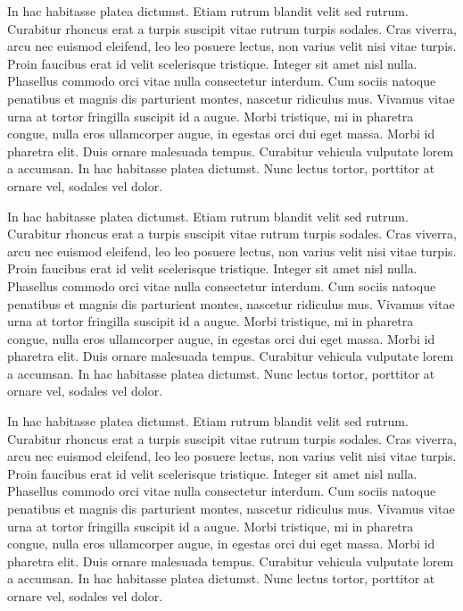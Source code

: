 In hac habitasse platea dictumst. Etiam rutrum blandit velit sed
rutrum. Curabitur rhoncus erat a turpis suscipit vitae rutrum turpis
sodales. Cras viverra, arcu nec euismod eleifend, leo leo posuere
lectus, non varius velit nisi vitae turpis. Proin faucibus erat id
velit scelerisque tristique. Integer sit amet nisl nulla. Phasellus
commodo orci vitae nulla consectetur interdum. Cum sociis natoque
penatibus et magnis dis parturient montes, nascetur ridiculus
mus. Vivamus vitae urna at tortor fringilla suscipit id a augue. Morbi
tristique, mi in pharetra congue, nulla eros ullamcorper augue, in
egestas orci dui eget massa. Morbi id pharetra elit. Duis ornare
malesuada tempus. Curabitur vehicula vulputate lorem a accumsan. In
hac habitasse platea dictumst. Nunc lectus tortor, porttitor at ornare
vel, sodales vel dolor.

In hac habitasse platea dictumst. Etiam rutrum blandit velit sed
rutrum. Curabitur rhoncus erat a turpis suscipit vitae rutrum turpis
sodales. Cras viverra, arcu nec euismod eleifend, leo leo posuere
lectus, non varius velit nisi vitae turpis. Proin faucibus erat id
velit scelerisque tristique. Integer sit amet nisl nulla. Phasellus
commodo orci vitae nulla consectetur interdum. Cum sociis natoque
penatibus et magnis dis parturient montes, nascetur ridiculus
mus. Vivamus vitae urna at tortor fringilla suscipit id a augue. Morbi
tristique, mi in pharetra congue, nulla eros ullamcorper augue, in
egestas orci dui eget massa. Morbi id pharetra elit. Duis ornare
malesuada tempus. Curabitur vehicula vulputate lorem a accumsan. In
hac habitasse platea dictumst. Nunc lectus tortor, porttitor at ornare
vel, sodales vel dolor.

In hac habitasse platea dictumst. Etiam rutrum blandit velit sed
rutrum. Curabitur rhoncus erat a turpis suscipit vitae rutrum turpis
sodales. Cras viverra, arcu nec euismod eleifend, leo leo posuere
lectus, non varius velit nisi vitae turpis. Proin faucibus erat id
velit scelerisque tristique. Integer sit amet nisl nulla. Phasellus
commodo orci vitae nulla consectetur interdum. Cum sociis natoque
penatibus et magnis dis parturient montes, nascetur ridiculus
mus. Vivamus vitae urna at tortor fringilla suscipit id a augue. Morbi
tristique, mi in pharetra congue, nulla eros ullamcorper augue, in
egestas orci dui eget massa. Morbi id pharetra elit. Duis ornare
malesuada tempus. Curabitur vehicula vulputate lorem a accumsan. In
hac habitasse platea dictumst. Nunc lectus tortor, porttitor at ornare
vel, sodales vel dolor.

